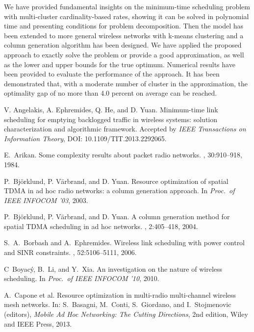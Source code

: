 \documentclass[10pt,onecolumn,journal,draftcls,oneside]{IEEEtran}
\newcounter{cond}
\begin{document}
We have provided fundamental insights on the minimum-time scheduling problem with multi-cluster cardinality-based rates, showing it can be solved in polynomial time and presenting conditions for problem decomposition. Then the model has been extended to more general wireless networks with k-means clustering and a column generation algorithm has been designed. We have applied the proposed approach to exactly solve the problem or provide a good approximation, as well as the lower and upper bounds for the true optimum. Numerical results have been provided to evaluate the performance of the approach. It has been demonstrated that, with a moderate number of cluster in the approximation, the optimality gap of no more than 4.0 percent on average can be reached. 
\begin{thebibliography}{1}


V. Angelakis, A. Ephremides, Q. He, and D. Yuan.
\newblock Minimum-time link scheduling for emptying backlogged traffic in wireless systems: solution characterization and algorithmic framework.
\newblock Accepted by {\em IEEE Transactions on Information Theory}, DOI: 10.1109/TIT.2013.2292065.


E.~Arikan.
\newblock Some complexity results about packet radio networks.
, 30:910--918, 1984.

P.~Bj{\"o}rklund, P. V{\"a}rbrand, and D. Yuan.
\newblock Resource optimization of spatial TDMA in ad hoc radio networks: a column generation approach.
\newblock In {\em Proc.\ of IEEE INFOCOM '03}, 2003.

P.~Bj{\"o}rklund, P. V{\"a}rbrand, and D. Yuan.
\newblock A column generation method for spatial TDMA scheduling in ad hoc networks.
, 2:405--418, 2004.

S.~A.~Borbash and A.~Ephremides.
\newblock Wireless link scheduling with power control and SINR constraints.
, 52:5106--5111, 2006.

C~Boyac{\'y}, B.~Li, and Y.~Xia.
\newblock An investigation on the nature of wireless scheduling.
\newblock In {\em Proc.\ of IEEE INFOCOM '10}, 2010.

A.~Capone et al.
\newblock Resource optimization in multi-radio multi-channel wireless mesh networks.
\newblock In: S.~Basagni, M.~Conti, S.~Giordano, and I.~Stojmenovic (editors),
{\em Mobile Ad Hoc Networking: The Cutting Directions}, 2nd edition,
Wiley and IEEE Press, 2013.


\end{thebibliography}
\end{document}
